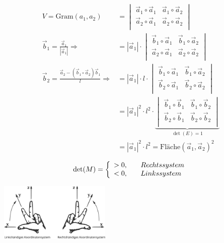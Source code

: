 \begin{align*}
	V = \text{Gram}(a_1, a_2) &= \begin{vmatrix}
		\vec{a}_1 \circ \vec{a}_1 & \vec{a}_1 \circ \vec{a}_2 \\
		\vec{a}_2 \circ \vec{a}_1 & \vec{a}_2 \circ \vec{a}_2 \\
	\end{vmatrix} \\
	\vec{b}_1 = \frac{\vec{a}_1}{|\vec{a}_1|} \Rightarrow &= |\vec{a}_1| \cdot \begin{vmatrix}
		\vec{b}_1 \circ \vec{a}_1 & \vec{b}_1 \circ \vec{a}_2 \\
		\vec{a}_2 \circ \vec{a}_1 & \vec{a}_2 \circ \vec{a}_2 \\
	\end{vmatrix} \\
	\vec{b}_2 = \frac{\vec{a}_2 - (\vec{b}_1 \circ \vec{a}_2)\vec{b}_1}{l} \Rightarrow &=  |\vec{a}_1| \cdot l \cdot \begin{vmatrix}
		\vec{b}_1 \circ \vec{a}_1 & \vec{b}_1 \circ \vec{a}_2 \\
		\vec{b}_2 \circ \vec{a}_1 & \vec{b}_2 \circ \vec{a}_2 \\
	\end{vmatrix} \\
	&= |\vec{a}_1|^2 \cdot l^2 \cdot \underbrace{\begin{vmatrix}
		\vec{b}_1 \circ \vec{b}_1 & \vec{b}_1 \circ \vec{b}_2 \\
		\vec{b}_2 \circ \vec{b}_1 & \vec{b}_2 \circ \vec{b}_2 \\
	\end{vmatrix}}_{\det(E) = 1} \\
	&=  |\vec{a}_1|^2 \cdot l^2  = \text{Fläche}(\vec{a}_1, \vec{a}_2)^2
\end{align*}

\begin{align*}
	\det(M) = \left\lbrace
	\begin{array}{r@{}l}
		> 0, & {}\qquad Rechtssystem \\
		< 0, & {}\qquad Linkssystem
	\end{array}
	\right.
\end{align*}

\begin{center}
\includegraphics[height=80pt]{./Images/Koordinatensysteme.png}
\end{center}
